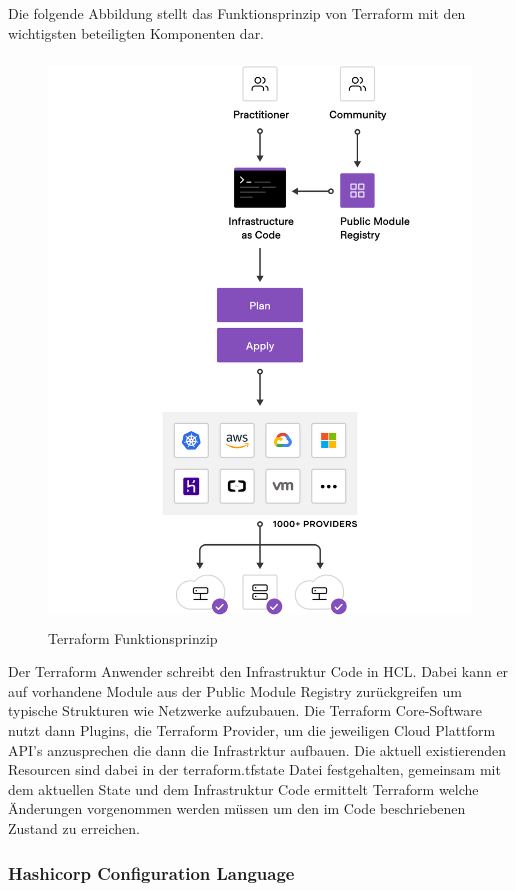 Die folgende Abbildung stellt das Funktionsprinzip von Terraform mit den
wichtigsten beteiligten Komponenten dar.

\begin{figure}[H]
  \includegraphics[keepaspectratio, height=15cm]{fig/hauptteil/Terraform.png}
  \caption{Terraform Funktionsprinzip}
  \centering
\end{figure}

Der Terraform Anwender schreibt den Infrastruktur Code in HCL. Dabei kann
er auf vorhandene Module aus der Public Module Registry zurückgreifen um
typische Strukturen wie Netzwerke aufzubauen. Die Terraform Core-Software
nutzt dann Plugins, die Terraform Provider, um die jeweiligen Cloud Plattform
API's anzusprechen die dann die Infrastrktur aufbauen. Die aktuell
existierenden Resourcen sind dabei in der terraform.tfstate Datei
festgehalten, gemeinsam mit dem aktuellen State und dem Infrastruktur Code
ermittelt Terraform welche Änderungen vorgenommen werden müssen um den
im Code beschriebenen Zustand zu erreichen.

\subsubsection{Hashicorp Configuration Language}

